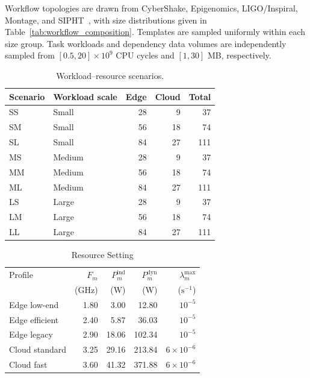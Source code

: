 \documentclass[journal]{IEEEtran}
\begin{document}
Workflow topologies are drawn from CyberShake, Epigenomics,
LIGO/Inspiral, Montage, and SIPHT~\cite{juve2013workflows},
with size distributions given in
Table~\ref{tab:workflow_composition}.
Templates are sampled uniformly within each size group.
Task workloads and dependency data volumes are independently
sampled from $[0.5,20]\times10^9$ CPU cycles and $[1,30]$ MB,
respectively.

\begin{table}[t]
\centering
\caption{Workload--resource scenarios.}
\label{tab:experiment_scenarios}
\footnotesize
\setlength{\tabcolsep}{5pt}
\renewcommand{\arraystretch}{1.08}
\begin{tabular}{@{}llrrr@{}}
\toprule
Scenario & Workload scale & Edge & Cloud & Total \\
\midrule
SS & Small  & 28 &  9 &  37 \\
SM & Small  & 56 & 18 &  74 \\
SL & Small  & 84 & 27 & 111 \\
\midrule
MS & Medium & 28 &  9 &  37 \\
MM & Medium & 56 & 18 &  74 \\
ML & Medium & 84 & 27 & 111 \\
\midrule
LS & Large  & 28 &  9 &  37 \\
LM & Large  & 56 & 18 &  74 \\
LL & Large  & 84 & 27 & 111 \\
\bottomrule
\end{tabular}
\end{table}

\begin{table}[t]
\centering
\caption{Resource Setting}
\label{tab:server_profiles}
\footnotesize
\setlength{\tabcolsep}{5pt}
\renewcommand{\arraystretch}{1.08}
\begin{tabular}{@{}lrrrr@{}}
\toprule
Profile & $F_m$ & $P_m^{\mathrm{ind}}$ & $P_m^{\mathrm{dyn}}$ & $\lambda_m^{\max}$ \\
& (GHz) & (W) & (W) & ($\mathrm{s}^{-1}$) \\
\midrule
Edge low-end   & 1.80 &  3.00 &  12.80 & $10^{-5}$ \\
Edge efficient & 2.40 &  5.87 &  36.03 & $10^{-5}$ \\
Edge legacy    & 2.90 & 18.06 & 102.34 & $10^{-5}$ \\
Cloud standard & 3.25 & 29.16 & 213.84 & $6\times10^{-6}$ \\
Cloud fast     & 3.60 & 41.32 & 371.88 & $6\times10^{-6}$ \\
\bottomrule
\end{tabular}
\end{table}
\end{document}
